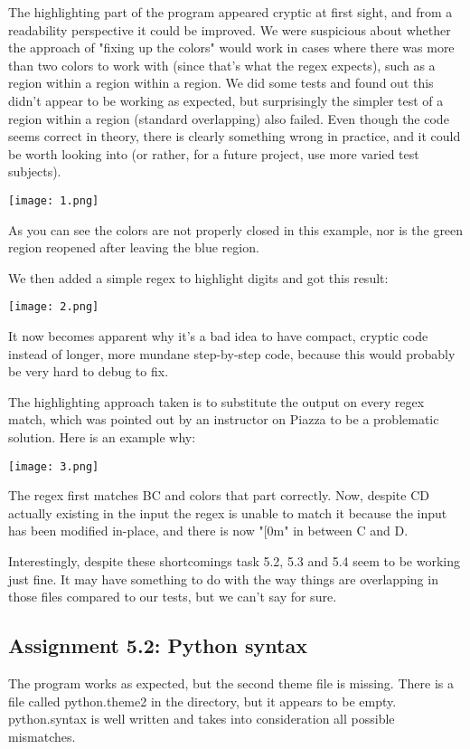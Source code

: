 \documentclass[a4paper]{article}
\begin{document}
The highlighting part of the program appeared cryptic at first sight, and from a readability perspective it could be improved. We were suspicious about whether the approach of "fixing up the colors" would work in cases where there was more than two colors to work with (since that's what the regex expects), such as a region within a region within a region. We did some tests and found out this didn't appear to be working as expected, but surprisingly the simpler test of a region within a region (standard overlapping) also failed. Even though the code seems correct in theory, there is clearly something wrong in practice, and it could be worth looking into (or rather, for a future project, use more varied test subjects).

\texttt{[image: 1.png]}

As you can see the colors are not properly closed in this example, nor is the green region reopened after leaving the blue region.

We then added a simple regex to highlight digits and got this result:

\texttt{[image: 2.png]}

It now becomes apparent why it's a bad idea to have compact, cryptic code instead of longer, more mundane step-by-step code, because this would probably be very hard to debug to fix.

The highlighting approach taken is to substitute the output on every regex match, which was pointed out by an instructor on Piazza to be a problematic solution. Here is an example why:

\texttt{[image: 3.png]}

The regex first matches BC and colors that part correctly. Now, despite CD actually existing in the input the regex is unable to match it because the input has been modified in-place, and there is now "[0m" in between C and D.

Interestingly, despite these shortcomings task 5.2, 5.3 and 5.4 seem to be working just fine. It may have something to do with the way things are overlapping in those files compared to our tests, but we can't say for sure.

\subsection*{Assignment 5.2:  Python syntax} \label{sec:assignment5.2}
The program works as expected, but the second theme file is missing. There is a file called python.theme2 in the directory, but it appears to be empty. python.syntax is well written and takes into consideration all possible mismatches.
\end{document}
